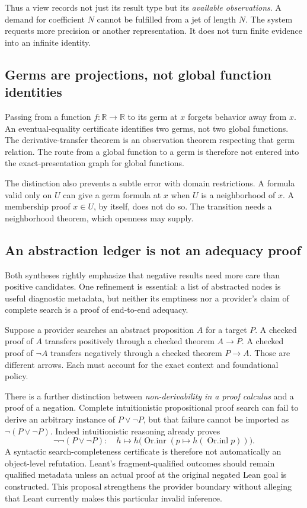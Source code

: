 \documentclass[11pt,a4paper]{article}
\newcommand{\R}{\mathbb R}
\theoremstyle{definition}
\begin{document}
Thus a view records not just its result type but its \emph{available observations}.
A demand for coefficient \(N\) cannot be fulfilled from a jet of length \(N\).
The system requests more precision or another representation. It does not turn
finite evidence into an infinite identity.

\subsection{Germs are projections, not global function identities}
Passing from a function \(f:\R\to\R\) to its germ at \(x\) forgets behavior away
from \(x\). An eventual-equality certificate identifies two germs, not two global
functions. The derivative-transfer theorem is an observation theorem respecting
that germ relation. The route from a global function to a germ is therefore not
entered into the exact-presentation graph for global functions.

The distinction also prevents a subtle error with domain restrictions. A formula
valid only on \(U\) can give a germ formula at \(x\) when \(U\) is a neighborhood
of \(x\). A membership proof \(x\in U\), by itself, does not do so. The transition
needs a neighborhood theorem, which openness may supply.

\subsection{An abstraction ledger is not an adequacy proof}\label{sec:negative}
Both syntheses rightly emphasize that negative results need more care than
positive candidates. One refinement is essential: a list of abstracted nodes is
useful diagnostic metadata, but neither its emptiness nor a provider's claim of
complete search is a proof of end-to-end adequacy.

Suppose a provider searches an abstract proposition \(A\) for a target \(P\).
A checked proof of \(A\) transfers positively through a checked theorem
\(A\to P\). A checked proof of \(\neg A\) transfers negatively through a checked
theorem \(P\to A\). Those are different arrows. Each must account for the exact
context and foundational policy.

There is a further distinction between \emph{non-derivability in a proof calculus}
and a proof of a negation. Complete intuitionistic propositional proof search
can fail to derive an arbitrary instance of \(P\lor\neg P\), but that failure
cannot be imported as \(\neg(P\lor\neg P)\). Indeed intuitionistic reasoning
already proves
\[
 \neg\neg(P\lor\neg P):
 \quad h\mapsto h\bigl(\operatorname{Or.inr}
   (p\mapsto h(\operatorname{Or.inl}p))\bigr).
\]
A syntactic search-completeness certificate is therefore not automatically an
object-level refutation. Leant's fragment-qualified outcomes should remain
qualified metadata unless an actual proof at the original negated Lean goal is
constructed. This proposal strengthens the provider boundary without alleging
that Leant currently makes this particular invalid inference.
\end{document}
